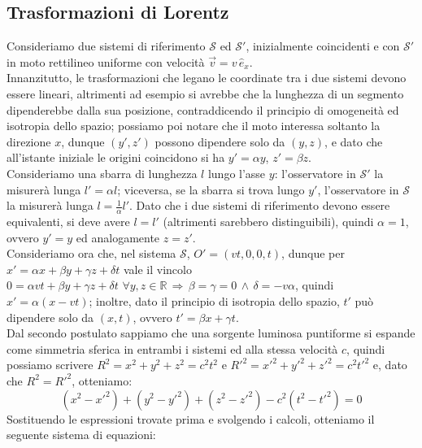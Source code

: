 \subsection{Trasformazioni di Lorentz}

Consideriamo due sistemi di riferimento $ \mathcal{S} $ ed $ \mathcal{S}' $, inizialmente coincidenti e con $ \mathcal{S}' $ in moto rettilineo uniforme con velocità $	\vec{v} = v\,\hat{e}_x $. \\ 
%
Innanzitutto, le trasformazioni che legano le coordinate tra i due sistemi devono essere lineari, altrimenti ad esempio si avrebbe che la lunghezza di un segmento dipenderebbe dalla sua posizione, contraddicendo il principio di omogeneità ed isotropia dello spazio; possiamo poi notare che il moto interessa soltanto la direzione $ x $, dunque $ (y',z') $ possono dipendere solo da $ (y,z) $, e dato che all'istante iniziale le origini coincidono si ha $ y' = \alpha y $, $ z' = \beta z $. \\ 
%
Consideriamo una sbarra di lunghezza $ l $ lungo l'asse $ y $: l'osservatore in $ \mathcal{S}' $ la misurerà lunga $ l' = \alpha l $; viceversa, se la sbarra si trova lungo $ y' $, l'osservatore in $ \mathcal{S} $ la misurerà lunga $ l = \frac{1}{\alpha} l' $. Dato che i due sistemi di riferimento devono essere equivalenti, si deve avere $ l = l' $ (altrimenti sarebbero distinguibili), quindi $ \alpha = 1 $, ovvero $ y' = y $ ed analogamente $ z = z' $. \\ 
%
Consideriamo ora che, nel sistema $ \mathcal{S} $, $ O' = (vt, 0, 0, t) $, dunque per $ x' = \alpha x + \beta y + \gamma z + \delta t $ vale il vincolo $ 0 = \alpha vt + \beta y + \gamma z + \delta t  \,\,\forall y,z\in\mathbb{R} \,\Rightarrow\, \beta = \gamma = 0 \,\wedge\, \delta = -v\alpha $, quindi $ x' = \alpha (x - vt) $; inoltre, dato il principio di isotropia dello spazio, $ t' $ può dipendere solo da $ (x,t) $, ovvero $ t' = \beta x + \gamma t $. \\ 
%
Dal secondo postulato sappiamo che una sorgente luminosa puntiforme si espande come simmetria sferica in entrambi i sistemi ed alla stessa velocità $ c $, quindi possiamo scrivere $ R^2 = x^2 + y^2 + z^2 = c^2 t^2 $ e $ R'^2 = x'^2 + y'^2 + z'^2 = c^2 t'^2 $ e, dato che $ R^2 = R'^2 $, otteniamo:
\begin{equation}
	(x^2- x'^2) + (y^2 - y'^2) + (z^2 - z'^2) - c^2 (t^2 - t'^2) = 0
	\label{eq:4}
\end{equation}
Sostituendo le espressioni trovate prima e svolgendo i calcoli, otteniamo il seguente sistema di equazioni:
